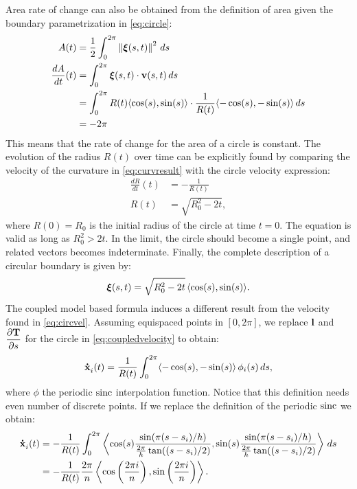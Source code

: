 Area rate of change can also be obtained from the definition of area given the boundary parametrization in \eqref{eq:circle}:
\begin{align}
    A(t) &= \frac{1}{2} \int_0^{2\pi} \left\lVert\bm{\xi}(s,t)\right\rVert^2\, ds\nonumber\\
    \dfrac{dA}{dt}(t) &= \int_0^{2\pi} \bm{\xi}(s,t)\cdot \mathbf{v}(s,t)\,ds \nonumber\\
    &= \int_0^{2\pi} R(t)\langle \cos(s),\sin(s)\rangle \cdot \frac{1}{R(t)} \langle -\cos(s),-\sin(s)\rangle \,ds \nonumber\\
    &= -2\pi \label{eq:dAdtcircle}
\end{align}
This means that the rate of change for the area of a circle is constant. The evolution of the radius $R(t)$ over time can be explicitly found by comparing the velocity of the curvature in \eqref{eq:curvresult} with the circle velocity expression:
\begin{align}
    \frac{dR}{dt}(t) &= -\frac{1}{R(t)} \label{eq:circvel}\\
    R(t) &= \sqrt{R_0^2 - 2t} \label{eq:radii},
\end{align}
where $R(0) = R_0$ is the initial radius of the circle at time $t=0$. The equation is valid as long as $R_0^2 > 2t$. In the limit, the circle should become a single point, and related vectors becomes indeterminate. Finally, the complete description of a circular boundary is given by:
\begin{equation}
    \bm{\xi}(s,t) = \sqrt{R_0^2 - 2t}\,\langle \cos(s), \sin(s) \rangle.
\end{equation}
The coupled model based formula induces a different result from the velocity found in \eqref{eq:circvel}. Assuming equispaced points in $[0, 2\pi]$, we replace $\mathbf{l}$ and $\dfrac{\partial \mathbf{T}}{\partial s}$ for the circle in \eqref{eq:coupledvelocity} to obtain:
\begin{equation}
    \dotx[i](t) = \frac{1}{R(t)} \int_0^{2\pi}  \langle -\cos(s), -\sin(s)\rangle \,\phi_i(s)\, ds,
\end{equation}
where $\phi$ the periodic $\operatorname{sinc}$ interpolation function. Notice that this definition needs even number of discrete points. If we replace the definition of the periodic $\operatorname{sinc}$ we obtain:
\begin{align}
    \dotx[i](t) &= -\frac{1}{R(t)} \int_0^{2\pi} \left\langle \cos(s)\frac{\sin(\pi(s-s_i) / h)}{\frac{2\pi}{h} \tan((s-s_i)/2)}, \sin(s)\frac{\sin(\pi(s-s_i) / h)}{\frac{2\pi}{h} \tan((s-s_i)/2)} \right\rangle\,ds\\
    &= -\frac{1}{R(t)}  \frac{2\pi}{n}\left\langle\cos \left(\frac{2\pi i}{n}\right), \sin\left(\frac{2\pi i }{n}\right)\right\rangle.
    \label{eq:curvaturevelocity}
\end{align}
